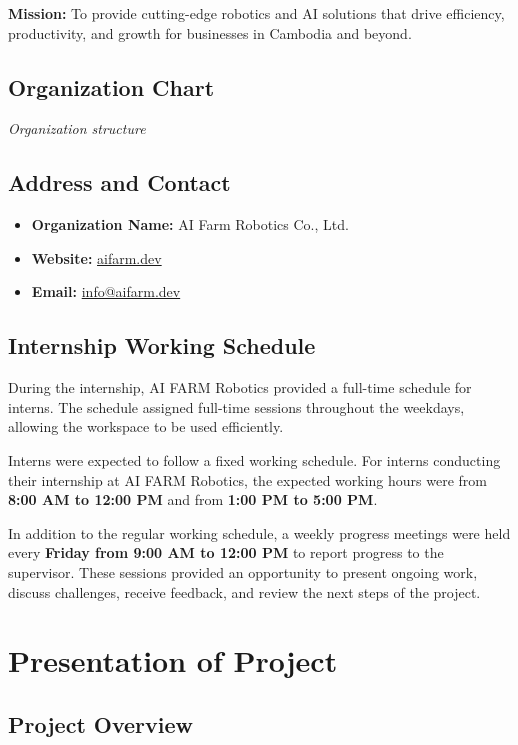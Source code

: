 \textbf{Mission:} To provide cutting-edge robotics and AI solutions that drive efficiency, productivity, and growth for businesses in Cambodia and beyond.

\subsection{Organization Chart}

\textit{Organization structure}

\subsection{Address and Contact}

\begin{itemize}
    \item \textbf{Organization Name:} AI Farm Robotics Co., Ltd.
    \item \textbf{Website:} \href{https://aifarm.dev/}{aifarm.dev}
    \item \textbf{Email:} \href{mailto:info@aifarm.dev}{info@aifarm.dev}
\end{itemize}

\subsection{Internship Working Schedule}

\hs During the internship, AI FARM Robotics provided a full-time schedule for interns. The schedule assigned full-time sessions throughout the weekdays, allowing the workspace to be used efficiently.

Interns were expected to follow a fixed working schedule. For interns conducting their internship at AI FARM Robotics, the expected working hours were from \textbf{8:00 AM to 12:00 PM} and from \textbf{1:00 PM to 5:00 PM}.

In addition to the regular working schedule, a weekly progress meetings were held every \textbf{Friday from 9:00 AM to 12:00 PM} to report progress to the supervisor. These sessions provided an opportunity to present ongoing work, discuss challenges, receive feedback, and review the next steps of the project.

\section{Presentation of Project}

\subsection{Project Overview}

